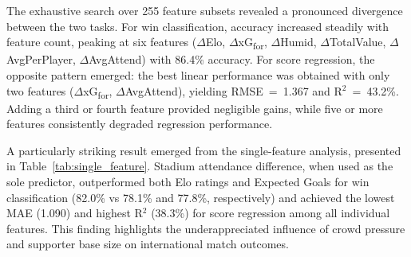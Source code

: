 \documentclass[a4paper,twoside]{article}
\begin{document}
The exhaustive search over 255 feature subsets revealed a pronounced divergence between the two tasks.
For win classification, accuracy increased steadily with feature count, peaking at six features ($\Delta$Elo, $\Delta$xG\textsubscript{for}, $\Delta$Humid, $\Delta$TotalValue, $\Delta$AvgPerPlayer, $\Delta$AvgAttend) with 86.4\% accuracy.
For score regression, the opposite pattern emerged: the best linear performance was obtained with only two features ($\Delta$xG\textsubscript{for}, $\Delta$AvgAttend), yielding RMSE~=~1.367 and R$^{2}$~=~43.2\%.
Adding a third or fourth feature provided negligible gains, while five or more features consistently degraded regression performance.

A particularly striking result emerged from the single-feature analysis, presented in Table~\ref{tab:single_feature}.
Stadium attendance difference, when used as the sole predictor, outperformed both Elo ratings and Expected Goals for win classification (82.0\% vs 78.1\% and 77.8\%, respectively) and achieved the lowest MAE (1.090) and highest R$^{2}$ (38.3\%) for score regression among all individual features.
This finding highlights the underappreciated influence of crowd pressure and supporter base size on international match outcomes.

\begin{table}[H]
\centering
\caption{Single-feature prediction performance (linear models, 50-split average).}
\label{tab:single_feature}
\small
{}
\end{table}
\end{document}

